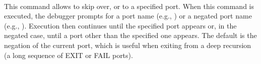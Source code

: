 \begin{descr}{1cm}
%
%
%
%

\\
This command allows to skip over, or to a specified port.  When this
command is executed, the debugger prompts for a port name (e.g.,
)
or a negated port name (e.g., \tld{}).
Execution then continues until the specified port appears or,
in the negated case, until a port other than the specified one appears.
The default is the negation of the current port, which is useful
when exiting from a deep recursion (a long sequence of EXIT or FAIL ports).


\end{descr}

